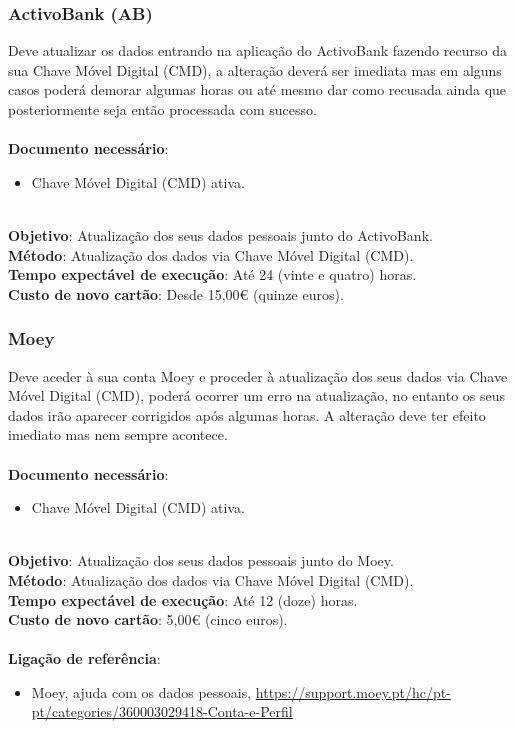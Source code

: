 \subsubsection{ActivoBank (AB)}

Deve atualizar os dados entrando na aplicação do ActivoBank fazendo
recurso da sua Chave Móvel Digital (CMD), a alteração deverá ser
imediata mas em alguns casos poderá demorar algumas horas ou até mesmo
dar como recusada ainda que posteriormente seja então processada com
sucesso. \\
\\
\textbf{Documento necessário}:
\begin{itemize}
	\item Chave Móvel Digital (CMD) ativa.
\end{itemize}
\leavevmode\\
\textbf{Objetivo}: Atualização dos seus dados pessoais junto do ActivoBank. \\
\textbf{Método}: Atualização dos dados via Chave Móvel Digital (CMD). \\
\textbf{Tempo expectável de execução}: Até 24 (vinte e quatro) horas. \\
\textbf{Custo de novo cartão}: Desde 15,00€ (quinze euros).

\subsubsection{Moey}

Deve aceder à sua conta Moey e proceder à atualização dos seus dados via
Chave Móvel Digital (CMD), poderá ocorrer um erro na atualização, no
entanto os seus dados irão aparecer corrigidos após algumas horas. A
alteração deve ter efeito imediato mas nem sempre acontece. \\
\\
\textbf{Documento necessário}:
\begin{itemize}
	\item Chave Móvel Digital (CMD) ativa.
\end{itemize}
\leavevmode\\
\textbf{Objetivo}: Atualização dos seus dados pessoais junto do Moey. \\
\textbf{Método}: Atualização dos dados via Chave Móvel Digital (CMD). \\
\textbf{Tempo expectável de execução}: Até 12 (doze) horas. \\
\textbf{Custo de novo cartão}: 5,00€ (cinco euros). \\
\\
\textbf{Ligação de referência}:
\begin{itemize}
	\item Moey, ajuda com os dados pessoais, \url{https://support.moey.pt/hc/pt-pt/categories/360003029418-Conta-e-Perfil}
\end{itemize}

